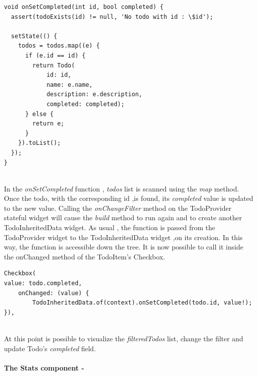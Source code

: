 \begin{code}
\mbox{}
\label{code:2.27}
\begin{verbatim}
void onSetCompleted(int id, bool completed) {
  assert(todoExists(id) != null, 'No todo with id : \$id');

  setState(() {
    todos = todos.map((e) {
      if (e.id == id) {
        return Todo(
            id: id,
            name: e.name,
            description: e.description,
            completed: completed);
      } else {
        return e;
      }
    }).toList();
  });
}
\end{verbatim}
\end{code}
\mbox{}\\
In the \textit{onSetCompleted }function , \textit{todos }list is scanned using the \textit{map }method. Once the todo, with the corresponding id ,is found, its \textit{completed }value is updated to the new value. Calling the \textit{onChangeFilter }method on the TodoProvider stateful widget will cause the \textit{build}  method to run again and to create another TodoInheritedData widget. As usual , the function is passed from the TodoProvider widget to the TodoInheritedData widget ,on its creation. In this way, the function is accessible down the tree. It is now possible to call it inside the onChanged method of the TodoItem's Checkbox.
\mbox{}\\
\begin{code}
\mbox{}
\label{code:2.28}
\begin{verbatim}
Checkbox(
value: todo.completed,
    onChanged: (value) {
    	TodoInheritedData.of(context).onSetCompleted(todo.id, value!);
}),
\end{verbatim}
\end{code}
\mbox{}\\
At this point is possible to visualize the \textit{filteredTodos} list, change the filter and update Todo’s \textit{completed }field.


\paragraph{The Stats component - }
\label{subpar:todo_app_inherited_widget_stats_component}


